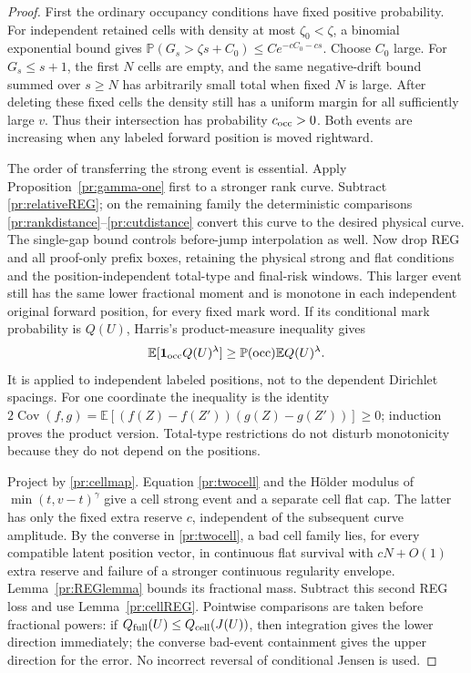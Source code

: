 \begin{proof}
First the ordinary occupancy conditions have fixed positive probability.
For independent retained cells with density at most $\zeta_0<\zeta$,
a binomial exponential bound gives
$\mathbb P(G_s>\zeta s+C_0)\le C e^{-cC_0-cs}$.
Choose $C_0$ large. For $G_s\le s+1$, the first $N$ cells are empty,
and the same negative-drift bound summed over $s\ge N$ has arbitrarily
small total when fixed $N$ is large. After deleting these fixed cells
the density still has a uniform margin for all sufficiently large $v$.
Thus their intersection has probability $c_{\rm occ}>0$. Both events
are increasing when any labeled forward position is moved rightward.

The order of transferring the strong event is essential. Apply
Proposition~\ref{pr:gamma-one} first to a stronger rank curve. Subtract
\eqref{pr:relativeREG}; on the remaining family the deterministic
comparisons \eqref{pr:rankdistance}--\eqref{pr:cutdistance} convert this
curve to the desired physical curve. The single-gap bound controls
before-jump interpolation as well. Now drop REG and all proof-only
prefix boxes, retaining the physical strong and flat conditions and the
position-independent total-type and final-risk windows. This larger
event still has the same lower fractional moment and is monotone in
each independent original forward position, for every fixed mark word.
If its conditional mark probability is $Q(U)$, Harris's product-measure
inequality gives
\begin{equation}
 \mathbb E[\boldsymbol1_{\rm occ}Q(U)^\lambda]
     \ge\mathbb P({\rm occ})\mathbb E Q(U)^\lambda.           \label{pr:Harris}
\end{equation}
It is applied to independent labeled positions, not to the dependent
Dirichlet spacings. For one coordinate the inequality is the identity
$2\operatorname{Cov}(f,g)=\mathbb E[(f(Z)-f(Z'))(g(Z)-g(Z'))]\ge0$;
induction proves the product version. Total-type restrictions do not
disturb monotonicity because they do not depend on the positions.

Project by \eqref{pr:cellmap}. Equation \eqref{pr:twocell} and the
H\"older modulus of $\min(t,v-t)^\gamma$ give a cell strong event and a
separate cell flat cap. The latter has only the fixed extra reserve $c$,
independent of the subsequent curve amplitude. By the converse in
\eqref{pr:twocell}, a bad cell family lies, for every compatible latent
position vector, in continuous flat survival with $cN+O(1)$ extra
reserve and failure of a stronger continuous regularity envelope.
Lemma~\ref{pr:REGlemma} bounds its fractional mass. Subtract this second
REG loss and use Lemma~\ref{pr:cellREG}. Pointwise comparisons are taken
before fractional powers: if $Q_{\rm full}(U)\le Q_{\rm cell}(J(U))$,
then integration gives the lower direction immediately; the converse
bad-event containment gives the upper direction for the error. No
incorrect reversal of conditional Jensen is used.


\end{proof}
